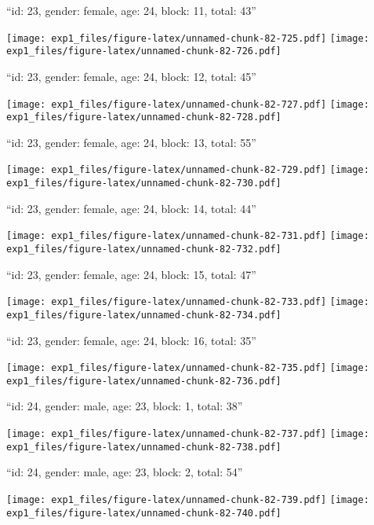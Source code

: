 \documentclass[11pt,,]{article}
\begin{document}
\newpage
[1] 

``id: 23, gender: female, age: 24, block: 11, total: 43''

\texttt{[image: exp1\_files/figure-latex/unnamed-chunk-82-725.pdf]}
\texttt{[image: exp1\_files/figure-latex/unnamed-chunk-82-726.pdf]}

\newpage
[1] 

``id: 23, gender: female, age: 24, block: 12, total: 45''

\texttt{[image: exp1\_files/figure-latex/unnamed-chunk-82-727.pdf]}
\texttt{[image: exp1\_files/figure-latex/unnamed-chunk-82-728.pdf]}

\newpage
[1] 

``id: 23, gender: female, age: 24, block: 13, total: 55''

\texttt{[image: exp1\_files/figure-latex/unnamed-chunk-82-729.pdf]}
\texttt{[image: exp1\_files/figure-latex/unnamed-chunk-82-730.pdf]}

\newpage
[1] 

``id: 23, gender: female, age: 24, block: 14, total: 44''

\texttt{[image: exp1\_files/figure-latex/unnamed-chunk-82-731.pdf]}
\texttt{[image: exp1\_files/figure-latex/unnamed-chunk-82-732.pdf]}

\newpage
[1] 

``id: 23, gender: female, age: 24, block: 15, total: 47''

\texttt{[image: exp1\_files/figure-latex/unnamed-chunk-82-733.pdf]}
\texttt{[image: exp1\_files/figure-latex/unnamed-chunk-82-734.pdf]}

\newpage
[1] 

``id: 23, gender: female, age: 24, block: 16, total: 35''

\texttt{[image: exp1\_files/figure-latex/unnamed-chunk-82-735.pdf]}
\texttt{[image: exp1\_files/figure-latex/unnamed-chunk-82-736.pdf]}

\newpage
[1] 

``id: 24, gender: male, age: 23, block: 1, total: 38''

\texttt{[image: exp1\_files/figure-latex/unnamed-chunk-82-737.pdf]}
\texttt{[image: exp1\_files/figure-latex/unnamed-chunk-82-738.pdf]}

\newpage
[1] 

``id: 24, gender: male, age: 23, block: 2, total: 54''

\texttt{[image: exp1\_files/figure-latex/unnamed-chunk-82-739.pdf]}
\texttt{[image: exp1\_files/figure-latex/unnamed-chunk-82-740.pdf]}
\end{document}
